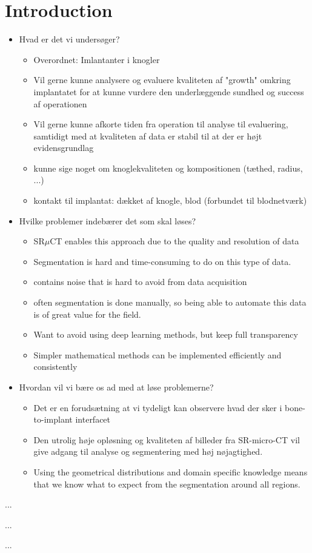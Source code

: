 
\section{Introduction}
\label{sec:intro}

\begin{itemize}
 \item Hvad er det vi undersøger?
     \begin{itemize}
     	\item Overordnet: Imlantanter i knogler
     	\item Vil gerne kunne analysere og evaluere kvaliteten af "growth" omkring implantatet for at kunne vurdere den underlæggende sundhed og success af operationen
     	\item Vil gerne kunne afkorte tiden fra operation til analyse til evaluering, samtidigt med at kvaliteten af data er stabil til at der er højt evidensgrundlag
     	\item kunne sige noget om knoglekvaliteten og kompositionen (tæthed, radius, ...)
     	\item kontakt til implantat: dækket af knogle, blod (forbundet til blodnetværk)
     \end{itemize}
 \item Hvilke problemer indebærer det som skal løses?
     \begin{itemize}
	\item SR$\mu$CT enables this approach due to the quality and resolution of data
     	\item Segmentation is hard and time-consuming to do on this type of data.
     	\item contains noise that is hard to avoid from data acquisition
     	\item often segmentation is done manually, so being able to automate this data is of great value for the field.
     	\item Want to avoid using deep learning methods, but keep full transparency 
     	\item Simpler mathematical methods can be implemented efficiently and consistently
     \end{itemize}
 \item Hvordan vil vi bære os ad med at løse problemerne?
     \begin{itemize}
     	\item Det er en forudsætning at vi tydeligt kan observere hvad der sker i bone-to-implant interfacet
     	\item Den utrolig høje opløsning og kvaliteten af billeder fra SR-micro-CT vil give adgang til analyse og segmentering med høj nøjagtighed.
     	\item Using the geometrical distributions and domain specific knowledge means that we know what to expect from the segmentation around all regions.
     \end{itemize}
\end{itemize}




...

...

...
